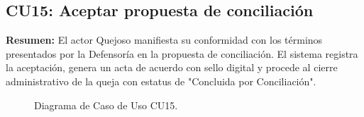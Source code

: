 \begin{appendices}
\subsection{CU15: Aceptar propuesta de conciliación}

\textbf{Resumen:} 
El actor Quejoso manifiesta su conformidad con los términos presentados por la Defensoría en la propuesta de conciliación. El sistema registra la aceptación, genera un acta de acuerdo con sello digital y procede al cierre administrativo de la queja con estatus de "Concluida por Conciliación".

\begin{figure}[htbp]
    \centering
    \figCUquince
    \caption{Diagrama de Caso de Uso CU15.}
    \label{fig:cu15}
\end{figure}


\end{appendices}
